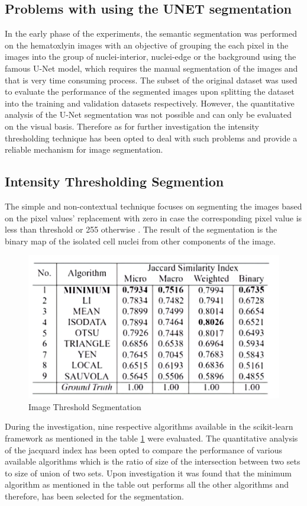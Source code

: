 \subsection{Problems with using the UNET segmentation }
In the early phase of the experiments, the semantic segmentation was performed on the hematoxlyin images with an objective of grouping the each pixel in the images into the group of nuclei-interior, nuclei-edge or the background using the famous U-Net model, which requires the manual segmentation of the images and that is very time consuming process.
The subset of the original dataset was used to evaluate the performance of the segmented images upon splitting the dataset into the training and validation datasets respectively. 
However, the quantitative analysis of the U-Net segmentation was not possible and can only be evaluated on the visual basis. 
Therefore as for further investigation the intensity thresholding technique has been opted to deal with such problems and provide a reliable mechanism for image segmentation. 

\subsection{Intensity Thresholding Segmention}

The simple and non-contextual technique focuses on segmenting the images based on the pixel values' replacement with zero in case the corresponding pixel value is less than threshold or 255 otherwise \citep{lectureimagesegmentation}. 
The result of the segmentation is the binary map of the isolated cell nuclei from other components of the image.

\begin{figure}[!htp]
    \centering
    \includegraphics[scale=0.2]{assets/JaccardSimilarity.png}
    \caption{Image Threshold Segmentation}
    \label{fig:jaccardmetrics}
\end{figure} 

 
During the investigation, nine respective algorithms available in the scikit-learn framework as mentioned in the table  \ref{fig:jaccardmetrics} were evaluated. 
The quantitative analysis of the jacquard index has been opted to compare the performance of various available algorithms which is the ratio of size of the intersection between two sets to size of union of two sets. 
Upon investigation it was found that the minimum algorithm as mentioned in the table out performs all the other algorithms and therefore, has been selected for the segmentation.
